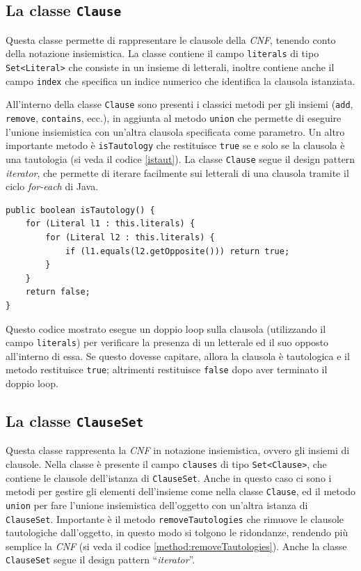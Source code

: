 \documentclass[a4paper,12pt]{report}
\begin{document}
\subsection{La classe \texttt{Clause}}
\label{Clause}
Questa classe permette di rappresentare le clausole della \emph{CNF}, tenendo conto della notazione insiemistica. La classe contiene il campo \texttt{literals} di tipo \texttt{Set<Literal>} che consiste in un insieme di letterali, inoltre contiene anche il campo \texttt{index} che specifica un indice numerico che identifica la clausola istanziata.

All'interno della classe \texttt{Clause} sono presenti i classici metodi per gli insiemi (\texttt{add}, \texttt{remove}, \texttt{contains}, ecc.), in aggiunta al metodo \texttt{union} che permette di eseguire l'unione insiemistica con un'altra clausola specificata come parametro. Un altro importante metodo è \texttt{isTautology} che restituisce \texttt{true} se e solo se la clausola è una tautologia (si veda il codice \ref{istaut}). La classe \texttt{Clause} segue il design pattern \emph{iterator}, che permette di iterare facilmente sui letterali di una clausola tramite il ciclo \emph{for-each} di Java.

\begin{minipage}{\linewidth}
\small
\begin{lstlisting}[caption={Metodo \texttt{isTautology} della classe \texttt{Clause}}, label={istaut}]
public boolean isTautology() {
    for (Literal l1 : this.literals) {
        for (Literal l2 : this.literals) { 
            if (l1.equals(l2.getOpposite())) return true;
        }
    }
    return false;
}
\end{lstlisting}
\end{minipage}
Questo codice mostrato esegue un doppio loop sulla clausola (utilizzando il campo \texttt{literals}) per verificare la presenza di un letterale ed il suo opposto all'interno di essa. Se questo dovesse capitare, allora la clausola è tautologica e il metodo restituisce \texttt{true}; altrimenti restituisce \texttt{false} dopo aver terminato il doppio loop.

\subsection{La classe \texttt{ClauseSet}}
\label{ClauseSet}
Questa classe rappresenta la \emph{CNF} in notazione insiemistica, ovvero gli insiemi di clausole. Nella classe è presente il campo \texttt{clauses} di tipo \texttt{Set<Clause>}, che contiene le clausole dell'istanza di \texttt{ClauseSet}. Anche in questo caso ci sono i metodi per gestire gli elementi dell'insieme come nella classe \texttt{Clause}, ed il metodo \texttt{union} per fare l'unione insiemistica dell'oggetto con un'altra istanza di \texttt{ClauseSet}. Importante è il metodo \texttt{removeTautologies} che rimuove le clausole tautologiche dall'oggetto, in questo modo si tolgono le ridondanze, rendendo più semplice la \emph{CNF} (si veda il codice \ref{method:removeTautologies}). Anche la classe \texttt{ClauseSet} segue il design pattern ``\emph{iterator}''.
\end{document}
